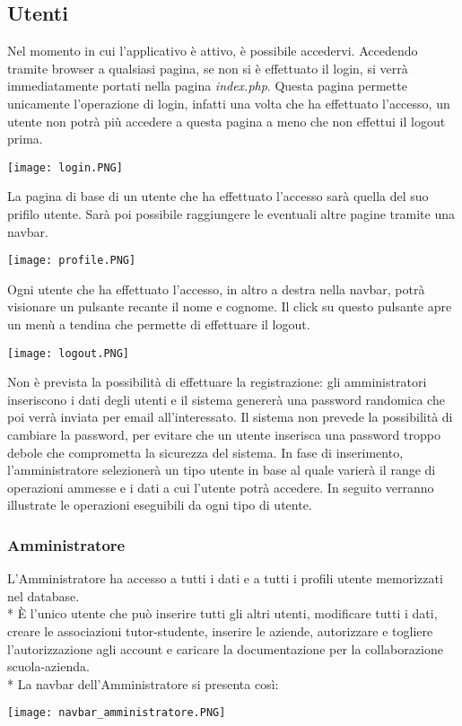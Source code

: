 \documentclass[12pt]{article}
\begin{document}
\subsection{Utenti}
Nel momento in cui l'applicativo è attivo, è possibile accedervi. Accedendo tramite browser a qualsiasi pagina, se non 
si è effettuato il login, si verrà immediatamente portati nella pagina \textit{index.php}. Questa pagina permette unicamente l'operazione di login, infatti una volta che ha effettuato l'accesso, un utente non potrà più accedere a questa pagina a meno che non effettui il logout prima.
\begin{center}
    \texttt{[image: login.PNG]}
\end{center}
La pagina di base di un utente che ha effettuato l'accesso sarà quella del suo prifilo utente. Sarà poi possibile raggiungere le eventuali altre pagine tramite una navbar.
\begin{center}
    \texttt{[image: profile.PNG]}
\end{center}
Ogni utente che ha effettuato l'accesso, in altro a destra nella navbar, potrà visionare un pulsante recante il nome e cognome. Il click su questo pulsante apre un menù a tendina che permette di effettuare il logout.
\begin{center}
    \texttt{[image: logout.PNG]}
\end{center}
Non è prevista la possibilità di effettuare la registrazione: gli amministratori inseriscono i dati degli utenti e il sistema genererà una password randomica che poi verrà inviata per email all'interessato. Il sistema non prevede la possibilità di cambiare la password, per evitare che un utente inserisca una password troppo debole che comprometta la sicurezza del sistema.
In fase di inserimento, l'amministratore selezionerà un tipo utente in base al quale varierà il range di operazioni ammesse e i dati a cui l'utente potrà accedere. In seguito verranno illustrate le operazioni eseguibili da ogni tipo di utente.






\newpage
\subsubsection{Amministratore}
L'Amministratore ha accesso a tutti i dati e a tutti i profili utente memorizzati nel database.\\*
È l'unico utente che può inserire tutti gli altri utenti, modificare tutti i dati, creare le associazioni tutor-studente, inserire le aziende, autorizzare e togliere l'autorizzazione agli account e caricare la documentazione per la collaborazione scuola-azienda.\\*
La navbar dell'Amministratore si presenta così:
\begin{center}
    \texttt{[image: navbar\_amministratore.PNG]}
\end{center}
\bigskip
\end{document}
